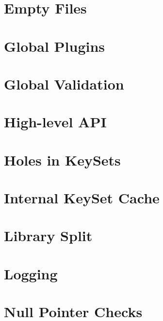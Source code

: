 \documentclass[twoside]{book}
\newcommand{\+}{\discretionary{\mbox{\scriptsize$\hookleftarrow$}}{}{}}
\begin{document}
\chapter{Empty Files}
\label{doc_decisions_empty_files_md}

\chapter{Global Plugins}
\label{doc_decisions_global_plugins_md}

\chapter{Global Validation}
\label{doc_decisions_global_validation_md}

\chapter{High-\/level A\+PI}
\label{doc_decisions_high_level_api_md}

\chapter{Holes in Key\+Sets}
\label{doc_decisions_holes_md}

\chapter{Internal Key\+Set Cache}
\label{doc_decisions_internal_cache_md}

\chapter{Library Split}
\label{doc_decisions_library_split_md}

\chapter{Logging}
\label{doc_decisions_logging_md}

\chapter{Null Pointer Checks}
\label{doc_decisions_null_pointer_checks_md}

\end{document}
